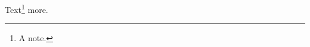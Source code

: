 \documentclass{article}
\let\oldfootnote\footnote
\renewcommand\footnote[1]{\oldfootnote{\small #1}}
\begin{document}
Text\footnote{A note.} more.
\end{document}
